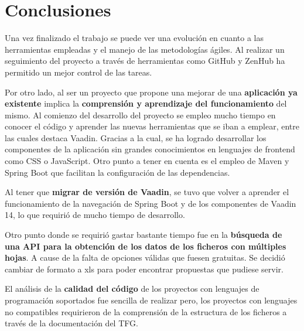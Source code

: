 
\section{Conclusiones}
Una vez finalizado el trabajo se puede ver una evolución en cuanto a las herramientas empleadas y el manejo de las metodologías ágiles. Al realizar un seguimiento del proyecto a través de herramientas como GitHub y ZenHub ha permitido un mejor control de las tareas.

Por otro lado, al ser un proyecto que propone una mejorar de una \textbf{aplicación ya existente} implica la \textbf{comprensión y aprendizaje del funcionamiento} del mismo. Al comienzo del desarrollo del proyecto se empleo mucho tiempo en conocer el código y aprender las nuevas herramientas que se iban a emplear, entre las cuales destaca Vaadin. Gracias a la cual, se ha logrado desarrollar los componentes de la aplicación sin grandes conocimientos en lenguajes de frontend como CSS o JavaScript. 
Otro punto a tener en cuenta es el empleo de Maven y Spring Boot que facilitan la configuración de las dependencias.

Al tener que \textbf{migrar de versión de Vaadin}, se tuvo que volver a aprender el funcionamiento de la navegación de Spring Boot y de los componentes de Vaadin 14, lo que requirió de mucho tiempo de desarrollo.

Otro punto donde se requirió gastar bastante tiempo fue en la \textbf{búsqueda de una API para la obtención de los datos de los ficheros con múltiples hojas}. A cause de la falta de opciones válidas que fuesen gratuitas. Se decidió cambiar de formato a xls para poder encontrar propuestas que pudiese servir.

El análisis de la \textbf{calidad del código} de los proyectos con lenguajes de programación soportados fue sencilla de realizar pero, los proyectos con lenguajes no compatibles requirieron de la comprensión de la estructura de los ficheros a través de la documentación del TFG.

